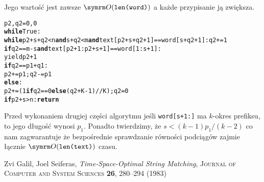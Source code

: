 \documentclass[a4paper]{article}
\begin{document}
Jego wartość jest zawsze \(\symrm O{\left(\texttt{len(word)}\right)}\) a każde przypisanie ją zwiększa.
\begin{alltt}
p2,q2= 0,0
\textbf{while} True:
  \textbf{while} p2+s+q2 < n \textbf{and} s+q2 < m \textbf{and} text[p2+s+q2+1] == word[s+q2+1]: q2+= 1
  \textbf{if} q2 == m-s \textbf{and} text[p2+1 : p2+s+1] == word[1 : s+1]:
    yield p2+1
  \textbf{if} q2 == p1+q1:
    p2+= p1; q2-= p1
  \textbf{else}:
    p2+= (1 \textbf{if} q2==0 \textbf{else} (q2+K-1)//K); q2= 0
  \textbf{if} p2+s > n: \textbf{return}
\end{alltt}
Przed wykonaniem drugiej części algorytmu jeśli \texttt{word[s+1:]} ma \(k\)-okres prefiksu, to jego długość wynosi \(p_1\).
Ponadto twierdzimy, że \(s<{\left(k-1\right)}p_1/{\left(k-2\right)}\) co nam zagwarantuje że bezpośrednie sprawdzanie równości podciągów zajmie łącznie \(\symrm O{\left(\texttt{len(text)}\right)}\) czasu.
\begin{thebibliography}
{}Zvi Galil, Joel Seiferas, \textit{Time-Space-Optimal String Matching}, \textsc{Journal of Computer and System Sciences} \textbf{26}, 280–294 (1983)
\end{thebibliography}
\end{document}
